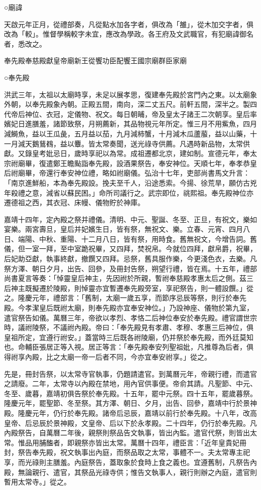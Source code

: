 ○廟諱

天啟元年正月，從禮部奏，凡從點水加各字者，俱改為「雒」，從木加交字者，俱改為「較」。惟督學稱較字未宜，應改為學政。各王府及文武職官，有犯廟諱御名者，悉改之。

奉先殿奉慈殿獻皇帝廟新王從饗功臣配饗王國宗廟群臣家廟

○奉先殿

洪武三年，太祖以太廟時享，未足以展孝思，復建奉先殿於宮門內之東。以太廟象外朝，以奉先殿象內朝。正殿五間，南向，深二丈五尺。前軒五間，深半之。製四代帝后神位、衣冠，定儀物、祝文。每日朝晡，帝及皇太子諸王二次朝享。皇后率嬪妃日進膳羞，諸節致祭，月朔薦新，其品物視元年所定。惟三月不用鮆魚，四月減鰣魚，益以王瓜彘，五月益以茄，九月減柿蟹，十月減木瓜蘆菔，益以山藥，十一月減天鵝鶿䳓，益以麞。皆太常奏聞，送光祿寺供薦。凡遇時新品物，太常供獻。又錄皇考妣忌日，歲時享祀以為常。成祖遷都北京，建如制。宣德元年，奉太宗祔廟畢，復遣鄭王瞻颭詣奉先殿，設酒果祭告，奉安神位。天順七年，奉孝恭皇后祔廟畢，帝還行奉安神位禮，略如祔廟儀。弘治十七年，吏部尚書馬文升言：「南京進鮮船，本為奉先殿設。挽夫至千人，沿途悉索。今揚、徐荒旱，願仿古兇年殺禮之意，減省以蘇民困。」命所司議行之。武宗即位，祧熙祖。奉先殿神位亦遷德祖之西，其衣冠、床幔、儀物貯於神庫。

嘉靖十四年，定內殿之祭并禮儀。清明、中元、聖誕、冬至、正旦，有祝文，樂如宴樂。兩宮壽旦，皇后并妃嬪生日，皆有祭，無祝文、樂。立春、元宵、四月八日、端陽、中秋、重陽、十二月八日，皆有祭，用時食。舊無祝文，今增告詞。舊儀，但一室一拜，至中室跪祝畢，又四拜，焚祝帛。今就位四拜，獻帛爵，祝畢，后妃助亞獻，執事終獻，撤饌又四拜。忌祭，舊具服作樂，今更淺色衣，去樂。凡祭方澤、朝日夕月，出告、回參，及冊封告祭，朔望行禮，皆在焉。十五年，禮部尚書夏言等奏：「悼靈皇后神主，先因祔於所親，暫祔奉慈殿孝惠太后之側。茲三后神主既擬遷於陵殿，則悼靈亦宜暫遷奉先殿旁室，享祀祭告，則一體設饌。」從之。隆慶元年，禮部言：「舊制，太廟一歲五享，而節序忌辰等祭，則行於奉先殿。今孝潔皇后既祔太廟，則奉先殿亦宜奉安神位。」乃設神座、儀物於第九室，遣官祭告如儀。萬曆三年，帝欲以孝烈、孝恪二后神位奉安於奉先殿。禮官謂世宗時，議祔陵祭，不議祔內殿。帝曰：「奉先殿見有孝肅、孝穆、孝惠三后神位，俱皇祖所定，宜遵行祔安。」蓋當時三后既各祔陵廟，仍并祭於奉先殿，而外廷莫知也。命輔臣張居正等入視。居正等言：「奉先殿奉安列聖祖妣，凡推尊為后者，俱得祔享內殿，比之太廟一帝一后者不同，今亦宜奉安祔享。」從之。

先是，冊封告祭，以太常寺官執事，仍題請遣官。到萬曆元年，帝親行禮，而遣官之請廢。二年，太常寺以內殿在禁地，用內官供事便。帝俞其請。凡聖節、中元、冬至、歲暮，嘉靖初俱告祭於奉先殿。十五年，罷中元祭。四十五年，罷歲暮祭。隆慶元年，罷聖節、冬至祭。其方澤、朝日、夕月，出告、回參，嘉靖中行於景神殿。隆慶元年，仍行於奉先殿。諸帝后忌辰，嘉靖以前行於奉先殿。十八年，改高皇帝、后忌辰於景神殿，文皇帝、后以下於永孝殿。二十四年，仍行於奉先殿。凡內殿祭告，自萬曆二年後，親祭則祭品告文執事，皆出內監。遣官代祭，則皆出太常。惟品用脯醢者，即親祭亦皆出太常。萬曆十四年，禮臣言：「近年皇貴妃冊封，祭告奉先殿，祝文執事出內庭，而祭品取之太常，事體不一。夫太常專主祀享，而光祿則主膳羞。內庭祭告，蓋取象於食時上食之義也。宜遵舊制，凡祭告內殿，無論親行、遣官，其祭品光祿寺供；惟告文執事人，親行則辦之內庭，遣官則暫用太常寺。」從之。


